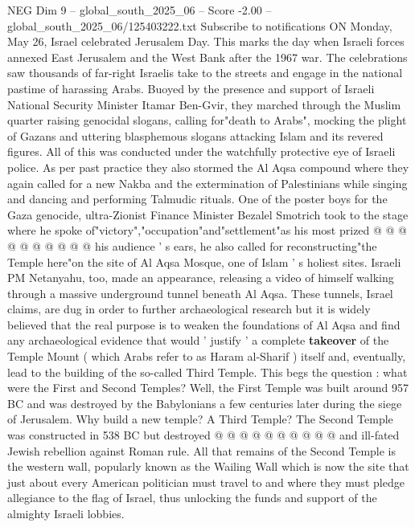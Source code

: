 \begin{textsample}{NEG Dim 9 – global\_south\_2025\_06 – Score -2.00 – global\_south\_2025\_06/125403222.txt}  \label{ex:f9_neg_277}
Subscribe to notifications ON Monday, May 26, Israel celebrated Jerusalem Day.
This marks the day when Israeli forces annexed East Jerusalem and the West Bank after the 1967 war.
The celebrations saw thousands of far-right Israelis take to the streets and engage in the national pastime of harassing Arabs.
Buoyed by the presence and support of Israeli National Security Minister Itamar Ben-Gvir, they marched through the Muslim quarter raising genocidal slogans, calling for"death to Arabs", mocking the plight of Gazans and uttering blasphemous slogans attacking Islam and its revered figures.
All of this was conducted under the watchfully protective eye of Israeli police.
As per past practice they also stormed the Al Aqsa compound where they again called for a new Nakba and the extermination of Palestinians while singing and dancing and performing Talmudic rituals.
One of the poster boys for the Gaza genocide, ultra-Zionist Finance Minister Bezalel Smotrich took to the stage where he spoke of"victory","occupation"and"settlement"as his most prized @ @ @ @ @ @ @ @ @ @ his audience ' s ears, he also called for reconstructing"the Temple here"on the site of Al Aqsa Mosque, one of Islam ' s holiest sites.
Israeli PM Netanyahu, too, made an appearance, releasing a video of himself walking through a massive underground tunnel beneath Al Aqsa.
These tunnels, Israel claims, are dug in order to further archaeological research but it is widely believed that the real purpose is to weaken the foundations of Al Aqsa and find any archaeological evidence that would ' justify ' a complete \textbf{takeover} of the Temple Mount ( which Arabs refer to as Haram al-Sharif ) itself and, eventually, lead to the building of the so-called Third Temple.
This begs the question : what were the First and Second Temples?
Well, the First Temple was built around 957 BC and was destroyed by the Babylonians a few centuries later during the siege of Jerusalem.
Why build a new temple?
A Third Temple?
The Second Temple was constructed in 538 BC but destroyed @ @ @ @ @ @ @ @ @ @ and ill-fated Jewish rebellion against Roman rule.
All that remains of the Second Temple is the western wall, popularly known as the Wailing Wall which is now the site that just about every American politician must travel to and where they must pledge allegiance to the flag of Israel, thus unlocking the funds and support of the almighty Israeli lobbies.

\end{textsample}
